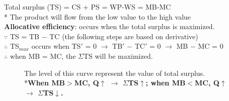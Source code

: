 \documentclass[UTF8]{article}
\begin{document}
\newpage
\noindent
Total surplus (TS) = CS + PS = WP-WS = MB-MC\\
* The product will flow from the low value to the high value\\
\textbf{Allocative efficiency}: occurs when the total surplus is maximized. \\
$\because$ TS = TB $-$ TC (the following steps are based on derivative)\\
$\therefore$ TS$_{max}$ occurs when TS$'$ = 0 $\rightarrow$ TB$'$ $-$ TC$'$ = 0 $\rightarrow$ MB $-$ MC = 0\\
$\therefore$ when MB = MC, the $\Sigma$TS will be maximized.\\
\begin{figure}[h!]
\begin{center}
\caption{The level of this curve represent the value of total surplus.\\
*\textbf{When MB$>$MC, Q$\uparrow$ $\longrightarrow$ $\Sigma$TS$\uparrow$; when MB$<$MC, Q$\uparrow$ $\longrightarrow$ $\Sigma$TS$\downarrow$.}}
\end{center}
\end{figure}
\end{document}

